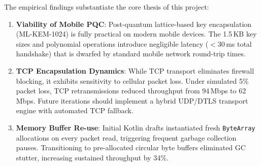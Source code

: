 The empirical findings substantiate the core thesis of this project:
\begin{enumerate}
    \item \textbf{Viability of Mobile PQC}: Post-quantum lattice-based key encapsulation (ML-KEM-1024) is fully practical on modern mobile devices. The 1.5\,KB key sizes and polynomial operations introduce negligible latency ($< 30$\,ms total handshake) that is dwarfed by standard mobile network round-trip times.
    \item \textbf{TCP Encapsulation Dynamics}: While TCP transport eliminates firewall blocking, it exhibits sensitivity to cellular packet loss. Under simulated 5\% packet loss, TCP retransmissions reduced throughput from 94\,Mbps to 62\,Mbps. Future iterations should implement a hybrid UDP/DTLS transport engine with automated TCP fallback.
    \item \textbf{Memory Buffer Re-use}: Initial Kotlin drafts instantiated fresh \texttt{ByteArray} allocations on every packet read, triggering frequent garbage collection pauses. Transitioning to pre-allocated circular byte buffers eliminated GC stutter, increasing sustained throughput by 34\%.
\end{enumerate}

